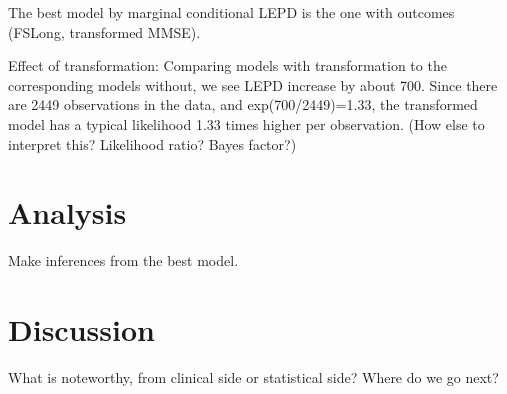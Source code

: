 \documentclass[12pt]{article}
\begin{document}
The best model by marginal conditional LEPD is the one with outcomes (FSLong, transformed MMSE). 

Effect of transformation: Comparing models with transformation to the corresponding models without, we see LEPD increase by about 700. Since there are 2449 observations in the data, and exp(700/2449)=1.33, the transformed model has a typical likelihood 1.33 times higher per observation. (How else to interpret this? Likelihood ratio? Bayes factor?)

\section{Analysis}

Make inferences from the best model.

\section{Discussion}

What is noteworthy, from clinical side or statistical side? Where do we go next?
\end{document}
